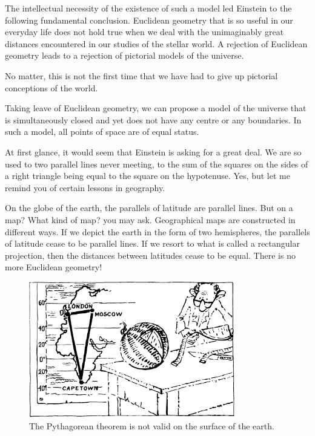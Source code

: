 The intellectual necessity of the existence of such a model led Einstein to the following fundamental con­clusion. Euclidean geometry that is so useful in our everyday life does not hold true when we deal with the unimaginably great distances encountered in our studies of the stellar world. A rejection of Euclidean geometry leads to a rejection of pictorial models of the universe.


No matter, this is not the first time that we have had to give up pictorial conceptions of the world.

Taking leave of Euclidean geometry, we can propose a model of the universe that is simultaneously closed and yet does not have any centre or any boundaries. In such a model, all points of space are of equal status.


At first glance, it would seem that Einstein is asking for a great deal. We are so used to two parallel lines never meeting, to the sum of the squares on the sides of a right triangle being equal to the square on the hypote­nuse. Yes, but let me remind you of certain lessons in geog­raphy.

On the globe of the earth, the parallels of latitude are parallel lines. But on a map? What kind of map? you may ask. Geographical maps are constructed in different ways. If we depict the earth in the form of two hemispheres, the parallels of latitude cease to be parallel lines. If we resort to what is called a rectangular projection, then the distances between latitudes cease to be equal. There is no more Euclidean geometry!

\begin{figure}[!ht]
\centering
\includegraphics[width=0.8\textwidth]{figures/fig-07-02.pdf}
\caption{The Pythagorean theorem is not valid on the surface of the earth.}
\label{fig-7.2}
\end{figure}

